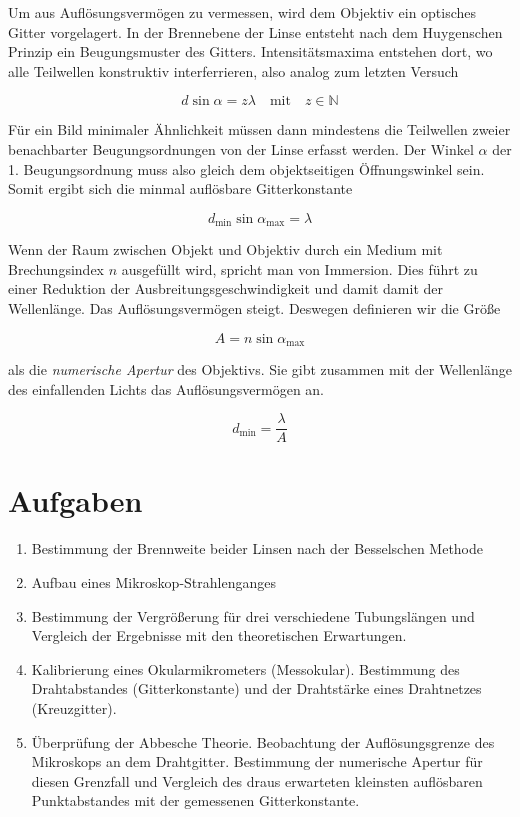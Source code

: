 \documentclass[a4paper,german,12pt,smallheadings]{scrartcl}
\begin{document}
Um aus Auflösungsvermögen zu vermessen, wird dem Objektiv ein optisches Gitter
vorgelagert. In der Brennebene der Linse entsteht nach dem Huygenschen Prinzip
ein Beugungsmuster des Gitters. Intensitätsmaxima entstehen dort, wo alle
Teilwellen konstruktiv interferrieren, also analog zum letzten Versuch

\begin{equation}
  d \sin \alpha = z \lambda \quad \text{mit} \quad z \in \mathbb{N}
\end{equation}

Für ein Bild minimaler Ähnlichkeit müssen dann mindestens die Teilwellen zweier
benachbarter Beugungsordnungen von der Linse erfasst werden. Der Winkel $\alpha$ der 1.
Beugungsordnung muss also gleich dem objektseitigen Öffnungswinkel sein. Somit
ergibt sich die minmal auflösbare Gitterkonstante

\begin{equation}
  d_\text{min} \sin \alpha_\text{max} = \lambda
\end{equation}

Wenn der Raum zwischen Objekt und Objektiv durch ein Medium mit Brechungsindex
$n$ ausgefüllt wird, spricht man von Immersion. Dies führt zu einer Reduktion
der Ausbreitungsgeschwindigkeit und damit damit der Wellenlänge. Das
Auflösungsvermögen steigt. Deswegen definieren wir die Größe

\begin{equation}
  A = n \sin \alpha_\text{max}
\end{equation}

als die \textit{numerische Apertur} des Objektivs. Sie gibt zusammen mit der
Wellenlänge des einfallenden Lichts das Auflösungsvermögen an.

\begin{equation}
  d_\text{min} = \frac{\lambda}{A}
\end{equation}


\section{Aufgaben}
\begin{enumerate}
  \item Bestimmung der Brennweite beider Linsen nach der Besselschen Methode
  \item Aufbau eines Mikroskop-Strahlenganges
  \item Bestimmung der Vergrößerung für drei verschiedene Tubungslängen und
    Vergleich der Ergebnisse mit den theoretischen Erwartungen.
  \item Kalibrierung eines Okularmikrometers (Messokular). Bestimmung des
    Drahtabstandes (Gitterkonstante) und der Drahtstärke eines Drahtnetzes
    (Kreuzgitter).
  \item Überprüfung der Abbesche Theorie. Beobachtung der Auflösungsgrenze des
    Mikroskops an dem Drahtgitter. Bestimmung der numerische Apertur für diesen
    Grenzfall und Vergleich des draus erwarteten kleinsten auflösbaren
    Punktabstandes mit der gemessenen Gitterkonstante.
\end{enumerate}
\end{document}
